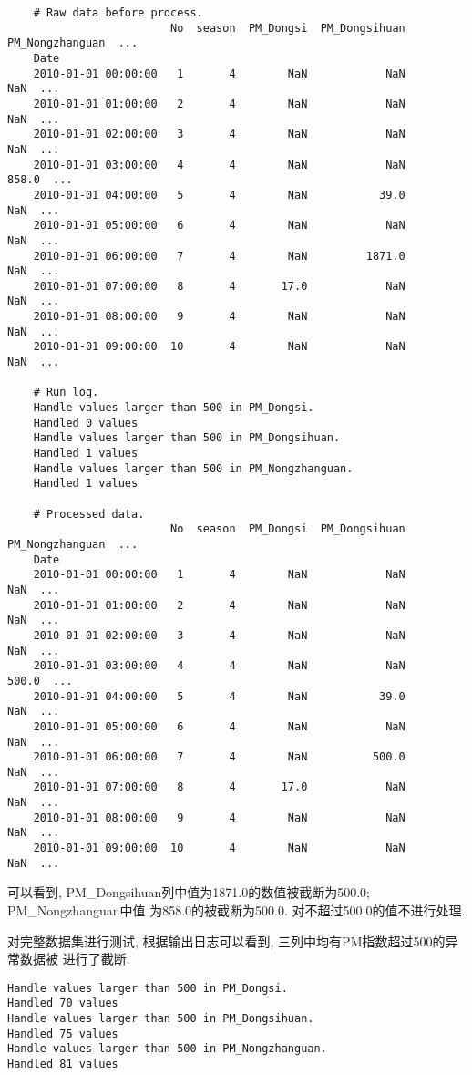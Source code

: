 \begin{lstlisting}
    # Raw data before process.
                         No  season  PM_Dongsi  PM_Dongsihuan  PM_Nongzhanguan  ...
    Date
    2010-01-01 00:00:00   1       4        NaN            NaN              NaN  ...
    2010-01-01 01:00:00   2       4        NaN            NaN              NaN  ...
    2010-01-01 02:00:00   3       4        NaN            NaN              NaN  ...
    2010-01-01 03:00:00   4       4        NaN            NaN            858.0  ...
    2010-01-01 04:00:00   5       4        NaN           39.0              NaN  ...
    2010-01-01 05:00:00   6       4        NaN            NaN              NaN  ...
    2010-01-01 06:00:00   7       4        NaN         1871.0              NaN  ...
    2010-01-01 07:00:00   8       4       17.0            NaN              NaN  ...
    2010-01-01 08:00:00   9       4        NaN            NaN              NaN  ...
    2010-01-01 09:00:00  10       4        NaN            NaN              NaN  ...
    
    # Run log.
    Handle values larger than 500 in PM_Dongsi.
    Handled 0 values
    Handle values larger than 500 in PM_Dongsihuan.
    Handled 1 values
    Handle values larger than 500 in PM_Nongzhanguan.
    Handled 1 values
    
    # Processed data.
                         No  season  PM_Dongsi  PM_Dongsihuan  PM_Nongzhanguan  ...
    Date
    2010-01-01 00:00:00   1       4        NaN            NaN              NaN  ...
    2010-01-01 01:00:00   2       4        NaN            NaN              NaN  ...
    2010-01-01 02:00:00   3       4        NaN            NaN              NaN  ...
    2010-01-01 03:00:00   4       4        NaN            NaN            500.0  ...
    2010-01-01 04:00:00   5       4        NaN           39.0              NaN  ...
    2010-01-01 05:00:00   6       4        NaN            NaN              NaN  ...
    2010-01-01 06:00:00   7       4        NaN          500.0              NaN  ...
    2010-01-01 07:00:00   8       4       17.0            NaN              NaN  ...
    2010-01-01 08:00:00   9       4        NaN            NaN              NaN  ...
    2010-01-01 09:00:00  10       4        NaN            NaN              NaN  ...
\end{lstlisting}
可以看到, PM\_Dongsihuan列中值为1871.0的数值被截断为500.0; PM\_Nongzhanguan中值
为858.0的被截断为500.0. 对不超过500.0的值不进行处理.\par

对完整数据集进行测试, 根据输出日志可以看到, 三列中均有PM指数超过500的异常数据被
进行了截断.
\begin{lstlisting}
Handle values larger than 500 in PM_Dongsi.
Handled 70 values
Handle values larger than 500 in PM_Dongsihuan.
Handled 75 values
Handle values larger than 500 in PM_Nongzhanguan.
Handled 81 values
\end{lstlisting}